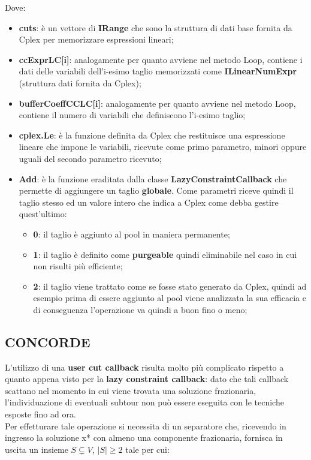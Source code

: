 \documentclass[11pt]{article}
\begin{document}
Dove:

\begin{itemize}
    \item \textbf{cuts}: è un vettore di \textbf{IRange} che sono la struttura di dati base fornita da Cplex per memorizzare espressioni lineari;
    \item \textbf{ccExprLC[i]}: analogamente per quanto avviene nel metodo Loop, contiene i dati delle variabili dell'i-esimo taglio memorizzati come \textbf{ILinearNumExpr} (struttura dati fornita da Cplex);
    \item \textbf{bufferCoeffCCLC[i]}: analogamente per quanto avviene nel metodo Loop, contiene il numero di variabili che definiscono l'i-esimo taglio;
    \item \textbf{cplex.Le}: è la funzione definita da Cplex che restituisce una espressione lineare che impone le variabili, ricevute come primo parametro, minori oppure uguali del secondo parametro ricevuto;
    \item \textbf{Add}: è la funzione eraditata dalla classe \textbf{LazyConstraintCallback} che permette di aggiungere un taglio \textbf{globale}. Come parametri riceve quindi il taglio stesso ed un valore intero che indica a Cplex come debba gestire quest'ultimo:
    \begin{itemize}
        \item \textbf{0}: il taglio è aggiunto al pool in maniera permanente;
        \item \textbf{1}: il taglio è definito come \textbf{purgeable} quindi eliminabile nel caso in cui non risulti più efficiente;
        \item \textbf{2}: il taglio viene trattato come se fosse stato generato da Cplex, quindi ad esempio prima di essere aggiunto al pool viene analizzata la sua efficacia e di conseguenza l'operazione va quindi a buon fino o meno;
    \end{itemize}

\end{itemize}

\subsection*{CONCORDE}
\label{sec:ConcordeS}

L'utilizzo di una \textbf{user cut callback} risulta molto più complicato rispetto a quanto appena visto per la \textbf{lazy constraint callback}: dato che tali callback scattano nel momento in cui viene trovata una soluzione frazionaria, l'individuazione di eventuali subtour non può essere eseguita con le tecniche esposte fino ad ora.\\
Per effetturare tale operazione si necessita di un separatore che, ricevendo in ingresso la soluzione x* con almeno una componente frazionaria, fornisca in uscita un insieme $S\subsetneq{V}$, $|S|\geq{2}$ tale per cui:
\end{document}
